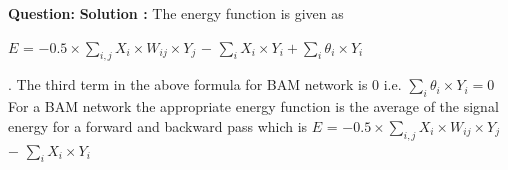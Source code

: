 \documentclass[12pt]{article}
\begin{document}
\textbf{Question: } 
\BlankLine	
\textbf{Solution :} The energy function is given as 
\begin{centering}
	$E$ = $-0.5 \times \displaystyle \sum_{i,j} X_i \times W_{ij} \times Y_j$ $-$ $\displaystyle \sum_{i} X_i \times Y_i + \sum_{i} \theta_i \times Y_i$ 
\end{centering}. 
\BlankLine
The third term in the above formula for BAM network is 0  i.e. $\sum_{i} \theta_i \times Y_i = 0$
\BlankLine
For a BAM network the appropriate energy function is the average of the signal energy for a forward and backward pass which is $E$ = $-0.5 \times \displaystyle \sum_{i,j}  X_i \times W_{ij} \times Y_j$ $-$ $\displaystyle \sum_{i} X_i \times Y_i$
\begin{enumerate}[label=\textbf{\alph* .}]
	

\end{enumerate}
\end{document}
